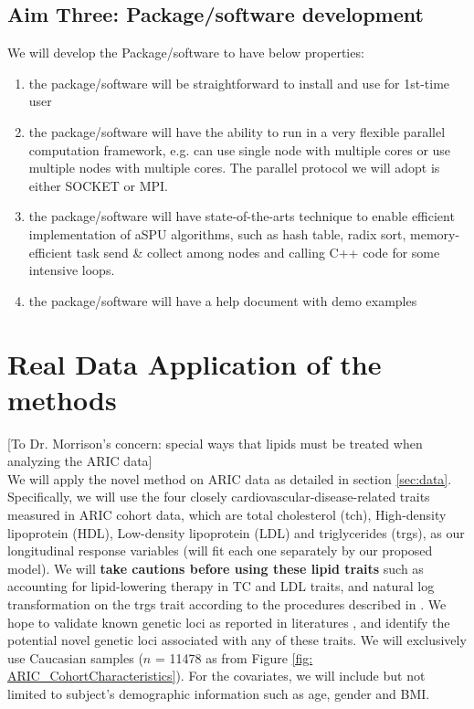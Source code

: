 \documentclass[12pt]{article}
\begin{document}
\subsection{Aim Three: Package/software development}
\label{sec:aim3}
We will develop the Package/software to have below properties:
\begin{enumerate}
\item the package/software will be straightforward to install and use for 1st-time user
\item the package/software will have the ability to run in a very flexible parallel computation framework, e.g. can use single node with multiple cores or use multiple nodes with multiple cores. The parallel protocol we will adopt is either SOCKET or MPI.
\item the package/software will have state-of-the-arts technique to enable efficient implementation of aSPU algorithms, such as hash table, radix sort, memory-efficient task send \& collect among nodes and calling C++ code for some intensive loops. 
\item the package/software will have a help document with demo examples
\end{enumerate}


\section{Real Data Application of the methods}
\label{sec:Data Application}
[To Dr. Morrison's concern: special ways that lipids must be treated when analyzing the ARIC data]\\
We will apply the novel method on ARIC data as detailed in section \ref{sec:data}. Specifically, we will use the four closely cardiovascular-disease-related traits measured in ARIC cohort data, which are total cholesterol (tch), High-density lipoprotein (HDL), Low-density lipoprotein (LDL) and triglycerides (trgs), as our longitudinal response variables (will fit each one separately by our proposed model). We will \textbf{take cautions before using these lipid traits} such as accounting for lipid-lowering therapy in TC and LDL traits, and natural log transformation on the trgs trait according to the procedures described in \cite{Peloso2014}. We hope to validate known genetic loci as reported in literatures \cite{Teslovich2010,Lange2014,Peloso2014,Consortium2013,Maxwell2013}, and identify the potential novel genetic loci associated with any of these traits. We will exclusively use Caucasian samples ($n$ = 11478 as from Figure \ref{fig: ARIC_CohortCharacteristics}). For the covariates, we will include but not limited to subject's demographic information such as age, gender and BMI. 
\end{document}
